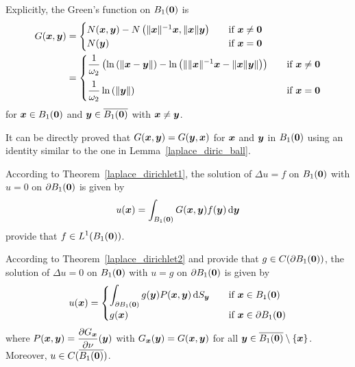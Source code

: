 Explicitly, the Green's function on $B_1({\bm{0}})$ is
\begin{align*}
G({\bm{x}},{\bm{y}}) &=
\begin{cases}
N({\bm{x}},{\bm{y}}) - N\left(\|{\bm{x}}\|^{-1} {\bm{x}},\|{\bm{x}}\|{\bm{y}}\right)
& \quad \text{if} \ {\bm{x}} \neq {\bm{0}} \\
\displaystyle N({\bm{y}}) & \quad \text{if} \ {\bm{x}} = {\bm{0}}
\end{cases} \\
&= \begin{cases}
\displaystyle \frac{1}{\omega_2} \left( \ln\left(\|{\bm{x}}-{\bm{y}}\|\right)
- \ln\left( \| \|{\bm{x}}\|^{-1} {\bm{x}}- \|{\bm{x}}\| {\bm{y}} \|\right) \right)
& \quad \text{if} \ {\bm{x}} \neq {\bm{0}} \\[1em]
\displaystyle \frac{1}{\omega_2} \ln\left(\|{\bm{y}}\|\right)
& \quad \text{if} \ {\bm{x}} = {\bm{0}}
\end{cases}
\end{align*}
for ${\bm{x}} \in B_1({\bm{0}})$ and ${\bm{y}} \in \overline{B_1({\bm{0}})}$
with ${\bm{x}} \neq {\bm{y}}$.

\begin{rmk}
It can be directly proved that $G({\bm{x}},{\bm{y}}) = G({\bm{y}},{\bm{x}})$
for ${\bm{x}}$ and ${\bm{y}}$ in $B_1({\bm{0}})$ using an identity
similar to the one in Lemma~\ref{laplace_diric_ball}.
\end{rmk}

According to Theorem~\ref{laplace_dirichlet1}, the solution of
$\Delta u = f$ on $B_1({\bm{0}})$ with $u = 0$ on
$\partial B_1({\bm{0}})$ is given by
\[
u({\bm{x}}) = \int_{B_1({\bm{0}})} G({\bm{x}},{\bm{y}})f({\bm{y}}) \,\mathrm{d}{{\bm{y}}}
\]
provide that $\displaystyle f\in L^1(B_1({\bm{0}}))$.

According to Theorem~\ref{laplace_dirichlet2} and provide that
$g\in C(\partial B_1({\bm{0}}))$, the solution of
$\Delta u = 0$ on $B_1({\bm{0}})$ with $u = g$ on $\partial B_1({\bm{0}})$
is given by
\[
u({\bm{x}}) =
\begin{cases}
\displaystyle
\int_{\partial B_1({\bm{0}})} g({\bm{y}}) P({\bm{x}},{\bm{y}}) \,\mathrm{d}{S}_{{\bm{y}}} &
\quad \text{if} \ {\bm{x}} \in B_1({\bm{0}}) \\
g({\bm{x}}) & \quad \text{if} \ {\bm{x}} \in \partial B_1({\bm{0}})
\end{cases}
\]
where
$\displaystyle P({\bm{x}},{\bm{y}}) =
\frac{\partial{G_{{\bm{x}}}}}{\partial \nu}({\bm{y}})$ with
$G_{{\bm{x}}}({\bm{y}}) = G({\bm{x}},{\bm{y}})$ for all
${\bm{y}} \in \overline{B_1({\bm{0}})} \setminus \{{\bm{x}}\}$.  Moreover,
$u \in C(\overline{B_1({\bm{0}})})$.

